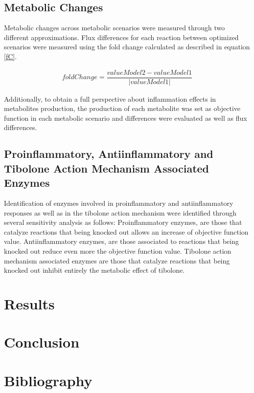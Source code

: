 \subsection{Metabolic Changes}
Metabolic changes across metabolic scenarios were measured through two different approximations. Flux differences for each reaction between optimized scenarios were measured using the fold change calculated as described in equation \ref{fC}.
\begin{ceqn}
\begin{align}
\label{fC}
   foldChange = \dfrac{valueModel2-valueModel1}{\left|valueModel1\right|}
\end{align}
\end{ceqn}
Additionally, to obtain a full perspective about inflammation effects in metabolites production, the production of each metabolite was set as objective function in each metabolic scenario and differences were evaluated as well as flux differences.
\subsection{Proinflammatory, Antiinflammatory and Tibolone Action Mechanism Associated Enzymes}
Identification of enzymes involved in proinflammatory and antiinflammatory responses as well as in the tibolone action mechanism were identified through several sensitivity analysis as follows: Proinflammatory enzymes, are those that catalyze reactions that being knocked out allows an increase of objective function value. Antiinflammatory enzymes, are those associated to reactions that being knocked out reduce even more the objective function value. Tibolone action mechanism associated enzymes are those that catalyze reactions that being knocked out inhibit entirely the metabolic effect of tibolone.
\section{Results}
\section{Conclusion}
\section{Bibliography}

